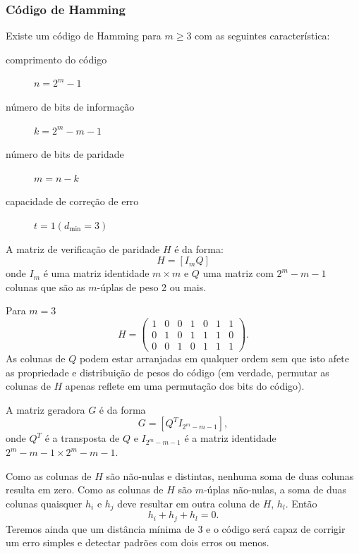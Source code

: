 \begin{frame}[allowframebreaks]
  \frametitle{Código de Hamming}

  Existe um código de Hamming para $m \geq 3$ com as seguintes característica:
  \begin{description}
    \item [comprimento do código] $n=2^m - 1$
    \item [número de bits de informação] $k=2^m - m - 1$
    \item [número de bits de paridade] $m=n-k$
    \item [capacidade de correção de erro] $t=1 (d_{\text{min}}=3)$
  \end{description}

  \framebreak

  A matriz de verificação de paridade $H$ é da forma:
  \begin{equation}
    H = [I_m Q]
  \end{equation}
  onde $I_m$ é uma matriz identidade $m \times m$ e $Q$ uma matriz com $2^m-m-1$ colunas que são as $m$-úplas de peso 2 ou mais.

  \vspace{2ex}
  Para $m=3$
  \begin{equation}
  H = 
  \begin{pmatrix}
    1 & 0 & 0 & 1 & 0 & 1 & 1 \\
    0 & 1 & 0 & 1 & 1 & 1 & 0 \\
    0 & 0 & 1 & 0 & 1 & 1 & 1 
  \end{pmatrix}.
  \end{equation}
  As colunas de $Q$ podem estar arranjadas em qualquer ordem sem que isto afete as propriedade e distribuição de pesos do código
  (em verdade, permutar as colunas de $H$ apenas reflete em uma permutação dos bits do código).

  A matriz geradora $G$ é da forma
  \begin{equation}
    G = [Q^T I_{2^m-m-1}],
  \end{equation}
  onde $Q^T$ é a transposta de $Q$ e $I_{2^m-m-1}$ é a matriz identidade $2^m-m-1 \times 2^m-m-1$.

  Como as colunas de $H$ são não-nulas e distintas, nenhuma soma de duas colunas resulta em zero.
  Como as colunas de $H$ são $m$-úplas não-nulas, a soma
  de duas colunas quaisquer $h_i$ e $h_j$ deve resultar em outra coluna de $H$, $h_l$. Então
  \begin{equation}
    h_i + h_j + h_l = 0.
  \end{equation}
  Teremos ainda que um distância mínima de 3 e o código será capaz de corrigir um erro simples e detectar padrões com dois erros ou menos.
\end{frame}
